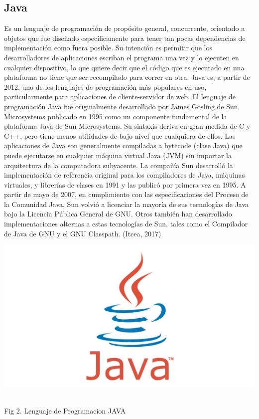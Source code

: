 \documentclass[12pt]{report}
\begin{document}
\subsection{Java}
Es un lenguaje de programación de propósito general, concurrente, orientado a objetos que fue diseñado específicamente para tener tan pocas dependencias de implementación como fuera posible. Su intención es permitir que los desarrolladores de aplicaciones escriban el programa una vez y lo ejecuten en cualquier dispositivo, lo que quiere decir que el código que es ejecutado en una plataforma no tiene que ser recompilado para correr en otra. Java es, a partir de 2012, uno de los lenguajes de programación más populares en uso, particularmente para aplicaciones de cliente-servidor de web.
El lenguaje de programación Java fue originalmente desarrollado por James Gosling de Sun Microsystems publicado en 1995 como un componente fundamental de la plataforma Java de Sun Microsystems. Su sintaxis deriva en gran medida de C y C++, pero tiene menos utilidades de bajo nivel que cualquiera de ellos. Las aplicaciones de Java son generalmente compiladas a bytecode (clase Java) que puede ejecutarse en cualquier máquina virtual Java (JVM) sin importar la arquitectura de la computadora subyacente.
La compañía Sun desarrolló la implementación de referencia original para los compiladores de Java, máquinas virtuales, y librerías de clases en 1991 y las publicó por primera vez en 1995. A partir de mayo de 2007, en cumplimiento con las especificaciones del Proceso de la Comunidad Java, Sun volvió a licenciar la mayoría de sus tecnologías de Java bajo la Licencia Pública General de GNU. Otros también han desarrollado implementaciones alternas a estas tecnologías de Sun, tales como el Compilador de Java de GNU y el GNU Classpath. (Itcea, 2017)

\begin{center}
\includegraphics[scale=0.2]{Documento/Figuras/fig3.png}
\begin{scriptsize}\\ 
Fig 2. Lenguaje de Programacion JAVA
\end{scriptsize}
\end{center}
\end{document}
